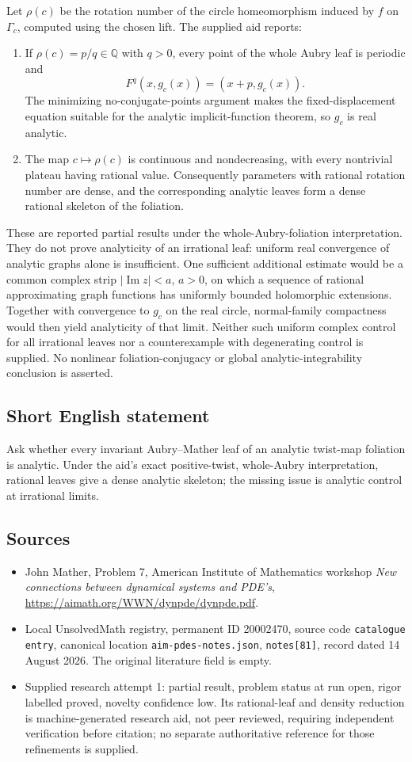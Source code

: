\documentclass[11pt]{article}
\newcommand{\Q}{\mathbb{Q}}
\begin{document}
Let $\rho(c)$ be the rotation number of the circle homeomorphism induced by $f$ on $\Gamma_c$, computed using the chosen lift. The supplied aid reports:
\begin{enumerate}
\item If $\rho(c)=p/q\in\Q$ with $q>0$, every point of the whole Aubry leaf is periodic and
\[
 F^q(x,g_c(x))=(x+p,g_c(x)).
\]
The minimizing no-conjugate-points argument makes the fixed-displacement equation suitable for the analytic implicit-function theorem, so $g_c$ is real analytic.
\item The map $c\mapsto\rho(c)$ is continuous and nondecreasing, with every nontrivial plateau having rational value. Consequently parameters with rational rotation number are dense, and the corresponding analytic leaves form a dense rational skeleton of the foliation.
\end{enumerate}
These are reported partial results under the whole-Aubry-foliation interpretation. They do not prove analyticity of an irrational leaf: uniform real convergence of analytic graphs alone is insufficient. One sufficient additional estimate would be a common complex strip $|\operatorname{Im}z|<a$, $a>0$, on which a sequence of rational approximating graph functions has uniformly bounded holomorphic extensions. Together with convergence to $g_c$ on the real circle, normal-family compactness would then yield analyticity of that limit. Neither such uniform complex control for all irrational leaves nor a counterexample with degenerating control is supplied. No nonlinear foliation-conjugacy or global analytic-integrability conclusion is asserted.
\subsection{Short English statement}
Ask whether every invariant Aubry--Mather leaf of an analytic twist-map foliation is analytic. Under the aid's exact positive-twist, whole-Aubry interpretation, rational leaves give a dense analytic skeleton; the missing issue is analytic control at irrational limits.
\subsection{Sources}
\begin{itemize}
\item John Mather, Problem 7, American Institute of Mathematics workshop \emph{New connections between dynamical systems and PDE's}, \url{https://aimath.org/WWN/dynpde/dynpde.pdf}.
\item Local UnsolvedMath registry, permanent ID 20002470, source code \texttt{catalogue entry}, canonical location \texttt{aim-pdes-notes.json}, \texttt{notes[81]}, record dated 14 August 2026. The original literature field is empty.
\item Supplied research attempt 1: partial result, problem status at run open, rigor labelled proved, novelty confidence low. Its rational-leaf and density reduction is machine-generated research aid, not peer reviewed, requiring independent verification before citation; no separate authoritative reference for those refinements is supplied.
\end{itemize}
\end{document}
